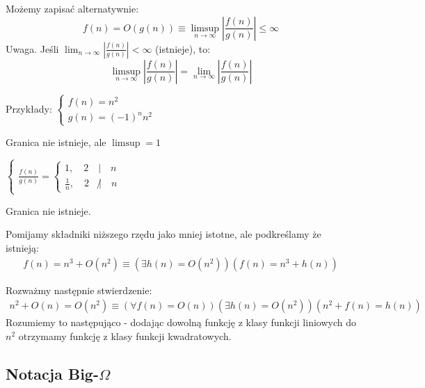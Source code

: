 \documentclass{article}
\newenvironment{fact}[1]{%
    \trivlist
    \item[\hskip\labelsep\textbf{Fact. #1.}]
    \ignorespaces
}{%
    \endtrivlist
}
\begin{document}
\begin{fact}{Definicja Big-O za pomocą granicy}
    Możemy zapisać alternatywnie:
    \[
        f(n) = O(g(n)) \equiv \limsup_{n\rightarrow \infty} \left|\frac{f(n)}{g(n)}\right| \leq \infty
    \]
    \noindent
    Uwaga. Jeśli $\lim_{n\rightarrow \infty} \left|\frac{f(n)}{g(n)}\right| < \infty$ (istnieje), to:
    \[
        \limsup_{n\rightarrow \infty} \left|\frac{f(n)}{g(n)}\right| =  \lim_{n\rightarrow \infty} \left|\frac{f(n)}{g(n)}\right| 
    \]
\end{fact}

Przykłady:
$
\begin{cases}
    f(n) = n^2\\
    g(n) = (-1)^n n^2
\end{cases}
$


Granica nie istnieje, ale $\limsup = 1$

$
\begin{cases}
    \frac{f(n)}{g(n)} = \begin{cases}
        1, \quad 2 \quad | \quad n\\
        \frac{1}{n}, \quad 2 \quad \not| \quad n
    \end{cases}
\end{cases}
$

Granica nie istnieje.

\begin{fact}{Dokładność zapisu Big-O}
    Pomijamy składniki niższego rzędu jako mniej istotne, ale podkreślamy że istnieją:
    \begin{align}
        f(n) = n^3 + O(n^2) \equiv 
        \left(\exists h(n) = O(n^2)\right)\left(f(n) = n^3 + h(n)\right)
    \end{align}

    \noindent
    Rozważmy następnie stwierdzenie:
    \begin{align}
        n^2 + O(n) = O(n^2) \equiv 
        \left(\forall f(n) = O(n)\right)
        \left(\exists h(n) = O(n^2)\right)
        \left(n^2 + f(n) = h(n)\right)
    \end{align}
    Rozumiemy to następująco - dodając dowolną funkcję z klasy funkcji liniowych do $n^2$ otrzymamy funkcję z klasy funkcji kwadratowych.
\end{fact}

\subsection{Notacja Big-$\Omega$}
\end{document}
